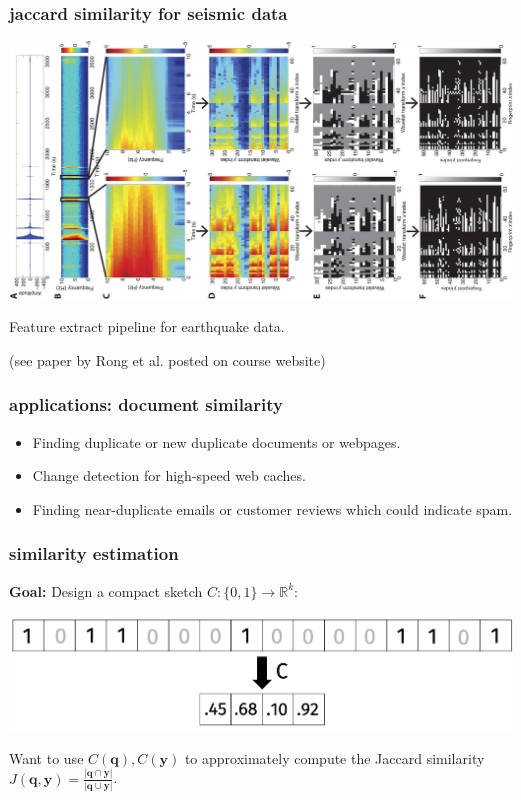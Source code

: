 \documentclass[compress]{beamer}
\newcommand{\bv}[1]{\mathbf{#1}}
\newcommand{\R}{\mathbb{R}}
\begin{document}
\begin{frame}
	\frametitle{jaccard similarity for seismic data}
	\begin{center}
			\vspace{-.5em}
			\includegraphics[width=.6\textwidth]{earthquakeFeatures.jpg}
			
			\vspace{-.5em}
			Feature extract pipeline for earthquake data.
			
			(see paper by Rong et al. posted on course website)
		\end{center}
\end{frame}

\begin{frame}
	\frametitle{applications: document similarity}
	\begin{itemize}
			\item Finding duplicate or new duplicate documents or webpages.
			\item Change detection for high-speed web caches.
			\item Finding near-duplicate emails or customer reviews which could indicate spam.
		\end{itemize}
	
\end{frame}


\begin{frame}
	\frametitle{similarity estimation}
	\textbf{Goal:} Design a compact sketch $C: \{0,1\}\rightarrow \R^k$:
	\begin{center}
			\vspace{-.5em}
			\includegraphics[width=.8\textwidth]{compression.png}
			\vspace{-.5em}
		\end{center}
	Want to use $C(\bv{q}), C(\bv{y})$ to approximately compute the Jaccard similarity $J(\bv{q},\bv{y}) = \frac{|\bv{q} \cap \bv{y}|}{|\bv{q} \cup \bv{y}|}$.
\end{frame}
\end{document}
